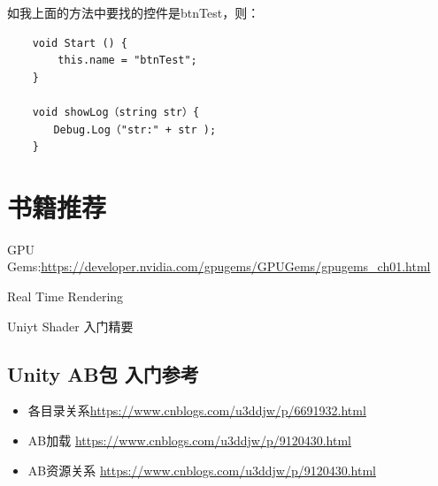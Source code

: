 \documentclass[UTF8,a4paper,12pt]{ctexbook}
\begin{document}
			如我上面的方法中要找的控件是btnTest，则：
			\begin{lstlisting}
	void Start () {
	    this.name = "btnTest";
	}
	
	void showLog（string str）{
	　　Debug.Log（"str:" + str );
	}
			\end{lstlisting}
	
\chapter{书籍推荐}
	
	GPU Gems:\url{https://developer.nvidia.com/gpugems/GPUGems/gpugems_ch01.html}
	
	Real Time Rendering
	
	Uniyt Shader 入门精要
	
	\section{Unity AB包 入门参考}
		\begin{itemize}
			\item 各目录关系\url{https://www.cnblogs.com/u3ddjw/p/6691932.html}
			\item AB加载 \url{https://www.cnblogs.com/u3ddjw/p/9120430.html}
			\item AB资源关系 \url{https://www.cnblogs.com/u3ddjw/p/9120430.html}
		\end{itemize}









		
\end{document}
